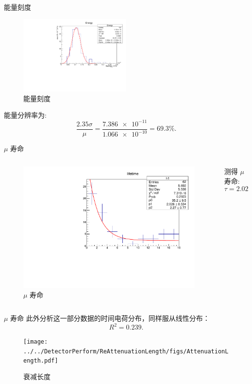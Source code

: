 \documentclass[10pt]{beamer}
\begin{document}
\begin{frame}[label={sec:org732602a}]{能量刻度}
\begin{figure}[htbp]
\centering
\includegraphics[width=0.5\textwidth]{../../DetectorPerform/ECali/qqdist.pdf}
\caption{能量刻度}
\end{figure}

能量分辨率为:
\begin{equation}
\label{eq:4}
\frac{2.35\sigma}{\mu} = \frac{\num{7.386e-11}}{\num{1.066e-10}} = 69.3\%.
\end{equation}
\end{frame}


\begin{frame}[label={sec:org6b888d2}]{\(\mu\) 寿命}
\begin{columns}
\begin{column}{0.5\columnwidth}
\begin{figure}[htbp]
\centering
\includegraphics[width=1.0\textwidth]{../../img/lifeTimeHist.pdf}
\caption{\(\mu\) 寿命}
\end{figure}
\end{column}

\begin{column}{0.5\columnwidth}
测得 \(\mu\) 寿命:  
\begin{equation}
\label{eq:5}
\tau = 2.026 \pm \qty{0.534}{\mu s}.
\end{equation}
\end{column}
\end{columns}
\end{frame}

\begin{frame}{\(\mu\) 寿命}
    此外分析这一部分数据的时间电荷分布，同样服从线性分布：
    $$R^2=0.239.$$
    \begin{figure}[htbp]
    \centering
    \texttt{[image: ../../DetectorPerform/ReAttenuationLength/figs/AttenuationLength.pdf]}
    \caption{衰减长度}
    \end{figure}
    \end{frame}
\end{document}
